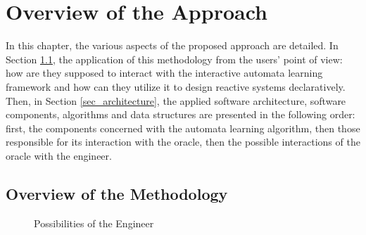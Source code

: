 \chapter{Overview of the Approach}
In this chapter, the various aspects of the proposed approach are detailed. In Section \ref{sec_methodology}, the application of this methodology from the users' point of view: how are they supposed to interact with the interactive automata learning framework and how can they utilize it to design reactive systems declaratively. Then, in Section \ref{sec_architecture}, the applied software architecture, software components, algorithms and data structures are presented in the following order: first, the components concerned with the automata learning algorithm, then those responsible for its interaction with the oracle, then the possible interactions of the oracle with the engineer.
\section{Overview of the Methodology} \label{sec_methodology}
\begin{figure}[!ht] 
	\centering
	\caption{Possibilities of the Engineer} %
	\label{fig_methodology_interactiontypes}
\end{figure}

